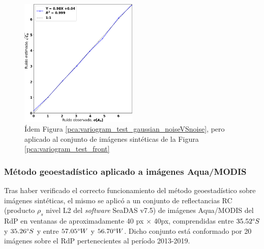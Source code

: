     
            \begin{figure}
            \centering
            \includegraphics[width=0.5\textwidth]{pca/figures/variogram_test_front_noiseVSnoise.png}
            \caption[Evaluación del método geoestadístico aplicado al conjunto de imágenes sintéticas de campo con escalón vértical.]{Ídem Figura \ref{pca:variogram_test_gaussian_noiseVSnoise}, pero aplicado al conjunto de imágenes sintéticas de la Figura \ref{pca:variogram_test_front}}
            \label{pca:variogram_test_front_noiseVSnoise}
            \end{figure}

        \subsubsection{Método geoestadístico aplicado a imágenes Aqua/MODIS}
        \label{pca:s:ruidoAqua}
            
            Tras haber verificado el correcto funcionamiento del método geoestadístico sobre imágenes sintéticas, el mismo se aplicó a un conjunto de reflectancias RC (producto $\rho_{s}$ nivel L2 del \textit{software} SeaDAS v7.5) de imágenes Aqua/MODIS del RdP en ventanas de aproximadamente 40 px $\times$ 40px, comprendidas entre $35.52\degree S$ y $35.26\degree S$ y entre $57.05\degree W$ y $56.70\degree W$. Dicho conjunto está conformado por 20 imágenes sobre el RdP pertenecientes al período 2013-2019.
            
